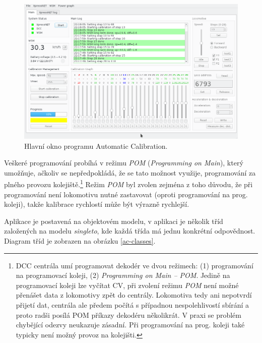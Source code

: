 \begin{figure}[h]
\includegraphics[width=\textwidth]{data/ac_progress.png}
\caption{Hlavní okno programu Automatic Calibration.}
\label{fig:ac-gui}
\end{figure}

Veškeré programování probíhá v režimu \textit{POM} (\textit{Programming on
Main}), který umožňuje, ačkoliv se nepředpokládá, že se tato možnost využije,
programování za plného provozu kolejiště.\footnote{DCC centrála umí programovat
dekodér ve dvou režimech: (1) programování na programovací koleji, (2)
\textit{Programming on Main -- POM}. Jedině na programovací koleji lze vyčítat
CV, při zvolení režimu \textit{POM} není možné přenášet data z lokomotivy zpět
do centrály.  Lokomotiva tedy ani nepotvrdí přijetí dat, centrála ale předem
počítá s případnou nespolehlivostí sbírání a proto radši posílá POM příkazy
dekodéru několikrát.  V praxi se problém chybějící odezvy neukazuje zásadní.
Při programování na prog.  koleji také typicky není možný provoz na kolejišti.}
Režim \textit{POM} byl zvolen zejména z toho důvodu, že při programování není
lokomotivu nutné zastavovat (oproti programování na prog. koleji), takže
kalibrace rychlostí může být výrazně rychlejší.

Aplikace je postavená na objektovém modelu, v aplikaci je několik tříd
založených na modelu \textit{singleto}, kde každá třída má jednu konkrétní
odpovědnost. Diagram tříd je zobrazen na obrázku
\ref{ac-classes}.

